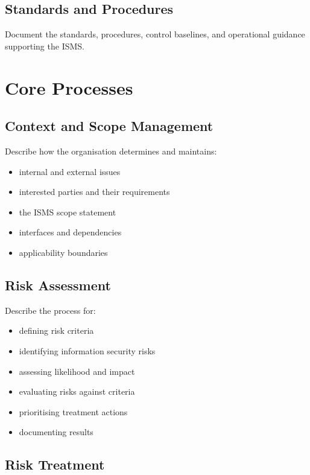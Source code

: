 \documentclass[
  letterpaper,
  DIV=11,
  numbers=noendperiod]{scrartcl}
\providecommand{\tightlist}{%
  \setlength{\itemsep}{0pt}\setlength{\parskip}{0pt}}
\begin{document}
\subsection{Standards and Procedures}\label{standards-and-procedures}

Document the standards, procedures, control baselines, and operational
guidance supporting the ISMS.

\section{Core Processes}\label{core-processes}

\subsection{Context and Scope
Management}\label{context-and-scope-management}

Describe how the organisation determines and maintains:

\begin{itemize}
\tightlist
\item
  internal and external issues
\item
  interested parties and their requirements
\item
  the ISMS scope statement
\item
  interfaces and dependencies
\item
  applicability boundaries
\end{itemize}

\subsection{Risk Assessment}\label{risk-assessment}

Describe the process for:

\begin{itemize}
\tightlist
\item
  defining risk criteria
\item
  identifying information security risks
\item
  assessing likelihood and impact
\item
  evaluating risks against criteria
\item
  prioritising treatment actions
\item
  documenting results
\end{itemize}

\subsection{Risk Treatment}\label{risk-treatment}
\end{document}
